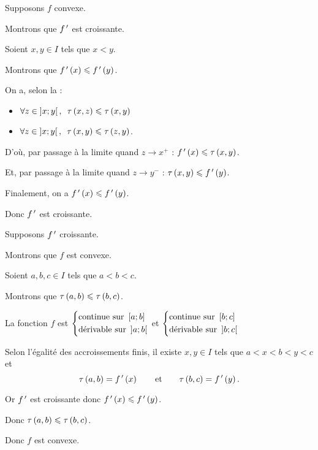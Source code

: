 \begin{dem}
\impdir

Supposons \(f\) convexe.

Montrons que \(f^{\,\prime}\) est croissante.

Soient \(x,y\in I\) tels que \(x<y\).

Montrons que \(f^{\,\prime}\left(x\right)\leqslant f^{\,\prime}\left(y\right)\).

On a, selon la  :

\begin{itemize}
\item \(\quantifs{\forall z\in\intervee{x}{y}}\tau\paren{x,z}\leq\tau\paren{x,y}\) \\

\item \(\quantifs{\forall z\in\intervee{x}{y}}\tau\paren{x,y}\leq\tau\paren{z,y}\).
\end{itemize}

D'où, par passage à la limite quand \(z\to x^+\) : \(f^{\,\prime}\left(x\right)\leqslant\tau\left(x,y\right)\).

Et, par passage à la limite quand \(z\to y^-\) : \(\tau\left(x,y\right)\leqslant f^{\,\prime}\left(y\right)\).

Finalement, on a \(f^{\,\prime}\left(x\right)\leqslant f^{\,\prime}\left(y\right)\).

Donc \(f^{\,\prime}\) est croissante.

\imprec

Supposons \(f^{\,\prime}\) croissante.

Montrons que \(f\) est convexe.

Soient \(a,b,c\in I\) tels que \(a<b<c\).

Montrons que \(\tau\left(a,b\right)\leqslant\tau\left(b,c\right)\).

La fonction \(f\) est \(\begin{dcases}\text{continue sur }\left[a;b\right] \\ \text{dérivable sur }\left]a;b\right[\end{dcases}\) et \(\begin{dcases}\text{continue sur }\left[b;c\right] \\ \text{dérivable sur }\left]b;c\right[\end{dcases}\)

Selon l'égalité des accroissements finis, il existe \(x,y\in I\) tels que \(a<x<b<y<c\) et \[\tau\left(a,b\right)=f^{\,\prime}\left(x\right)\qquad\text{et}\qquad\tau\left(b,c\right)=f^{\,\prime}\left(y\right).\]

Or \(f^{\,\prime}\) est croissante donc \(f^{\,\prime}\left(x\right)\leqslant f^{\,\prime}\left(y\right)\).

Donc \(\tau\left(a,b\right)\leqslant\tau\left(b,c\right)\).

Donc \(f\) est convexe.
\end{dem}

